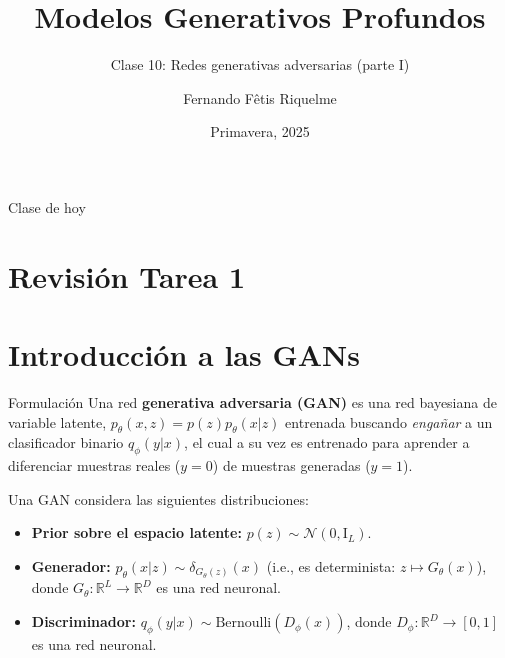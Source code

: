 \documentclass{beamer}
\title{Modelos Generativos Profundos}
\subtitle{Clase 10: Redes generativas adversarias (parte I)}
\author{Fernando Fêtis Riquelme}
\institute{
    Facultad de Ciencias Físicas y Matemáticas\\
    Universidad de Chile
}
\date{Primavera, 2025}
\newcommand{\R}{\mathbb{R}}
\begin{document}
\begin{frame}
    \titlepage
\end{frame}

\begin{frame}{Clase de hoy}
    \tableofcontents
\end{frame}

\section{Revisión Tarea 1}

\section{Introducción a las GANs}

\begin{frame}{Formulación}
    Una red \textbf{generativa adversaria (GAN)} es una red bayesiana de variable latente, $p_\theta(x,z)=p(z)p_\theta(x|z)$ entrenada buscando \textit{engañar} a un clasificador binario $ q_\phi(y|x)$, el cual a su vez es entrenado para aprender a diferenciar muestras reales ($y=0$) de muestras generadas ($y=1$).

    Una GAN considera las siguientes distribuciones:
    \begin{itemize}
        \item \textbf{Prior sobre el espacio latente:} $p(z)\sim\mathcal{N}{(0,\text{I}_L)}$.
        \item \textbf{Generador:} $p_\theta(x|z)\sim\delta_{G_\theta(z)}(x)$ (i.e., es determinista: $z\mapsto G_\theta(x)$), donde $G_\theta:\R^L\to\R^D$ es una red neuronal.
        \item \textbf{Discriminador:} $q_\phi(y|x)\sim\text{Bernoulli}(D_\phi(x))$, donde $D_\phi:\R^D\to[0,1]$ es una red neuronal.
    \end{itemize}
\end{frame}
\end{document}

